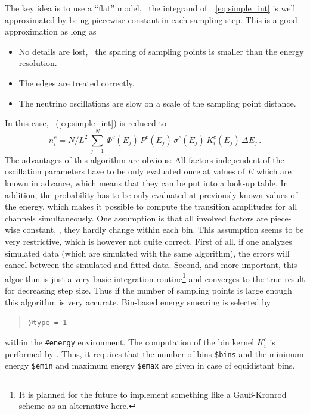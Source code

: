 The key idea is to use a ``flat'' model, \ie\ the integrand 
of~\eq~\ref{eq:simple_int}  is well approximated by being piecewise
constant in each sampling step. This is a good approximation as long as
\begin{itemize}
\item
 No details are lost, \ie\ the spacing of sampling points 
is smaller than the energy resolution.
\item
The edges are treated correctly.
\item
 The neutrino oscillations are slow on a scale of the sampling point distance.
\end{itemize}
In this case, \eq~(\ref{eq:simple_int}) is reduced to
\begin{equation}
\label{eq:algo_one}
n_i^c=N/L^2 \, \sum_{j=1}^N \,  \Phi^c(E_j)\,
P^c(E_j)\,
\sigma^c(E_j)\,
K_i^c(E_j) \, \Delta E_j \,.
\end{equation}
The advantages of this algorithm are obvious: All factors
independent of the oscillation parameters have to be only evaluated once
at values of $E$ which are known in advance, which means that they can be put 
into a look-up table. In addition, the probability
has to be only evaluated at previously known values of the energy, which
makes it possible to compute the transition amplitudes for all channels
simultaneously. One assumption is that all involved factors are piece-wise
constant, \ie, they hardly change within each bin. This 
assumption seems to be very restrictive, which is however not quite correct.
First of all, if one analyzes simulated data (which are simulated with the same algorithm), the errors
will cancel between the simulated and fitted data. Second, and more important,
this algorithm is just a very basic integration routine\footnote{It is planned 
for the future to implement something like a Gau\ss-Kronrod scheme as an
alternative here.} and converges to the true result for decreasing step size.
Thus if the number of sampling points is large enough this algorithm is very
accurate. Bin-based energy smearing is selected by
%
%
\begin{quote}
{\tt \tb @type = 1}
\end{quote}
within the {\tt \#energy} environment.
The computation of the bin kernel $K_i^c$ is performed
by \GLOBES. Thus, it requires that the number of bins
{\tt \$bins} and the minimum energy {\tt \$emin} and maximum energy {\tt \$emax} are given in case of equidistant bins.
%
